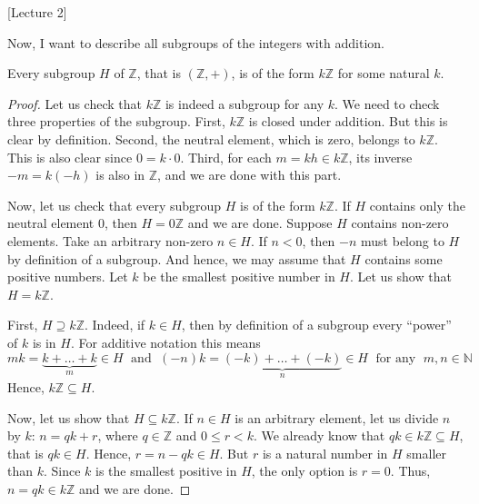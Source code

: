 [Lecture 2]


Now, I want to describe all subgroups of the integers with addition.

\begin{claim}
\label{claim::Zsubgroups}
Every subgroup $H$ of $\mathbb Z$, that is $(\mathbb Z, +)$, is of the form $k\mathbb Z$ for some natural $k$.
\end{claim}
\begin{proof}
Let us check that $k \mathbb Z$ is indeed a subgroup for any $k$.
We need to check three properties of the subgroup.
First, $k\mathbb Z$ is closed under addition.
But this is clear by definition.
Second, the neutral element, which is zero, belongs to $k\mathbb Z$.
This is also clear since $0 = k \cdot 0$.
Third, for each $m = kh \in k\mathbb Z$, its inverse $-m= k(-h)$ is also in $\mathbb Z$, and we are done with this part.

Now, let us check that every subgroup $H$ is of the form $k \mathbb Z$.
If $H$ contains only the neutral element $0$, then $H = 0\mathbb Z$ and we are done.
Suppose $H$ contains non-zero elements.
Take an arbitrary non-zero $n \in H$.
If $n < 0$, then $-n$ must belong to $H$ by definition of a subgroup.
And hence, we may assume that $H$ contains some positive numbers.
Let $k$ be the smallest positive number in $H$.
Let us show that $H = k \mathbb Z$.

First, $H \supseteq k \mathbb Z$.
Indeed, if $k\in H$, then by definition of a subgroup every ``power'' of $k$ is in $H$.
For additive notation this means 
\[
mk  = \underbrace{k + \ldots + k}_m \in H\;\text{ and }\;(-n)k=\underbrace{(-k) + \ldots + (-k)}_n\in H\; \text{ for any }\;m, n\in \mathbb N
\]
Hence, $k\mathbb Z\subseteq H$.

Now, let us show that $H\subseteq k\mathbb Z$.
If $n\in H$ is an arbitrary element, let us divide $n$ by $k$: $n = q k + r$, where $q\in \mathbb Z$ and $0 \leqslant r < k$.
We already know that $qk \in k\mathbb Z\subseteq H$, that is $qk \in H$.
Hence, $r = n - qk \in H$.
But $r$ is a natural number in $H$ smaller than $k$.
Since $k$ is the smallest positive in $H$, the only option is $r = 0$.
Thus, $n = qk\in k\mathbb Z$ and we are done.
\end{proof}

